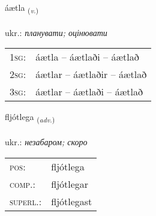 \documentclass[frontgrid, backgrid]{flacards}\usepackage[]{graphicx}\usepackage[]{xcolor}
\begin{document}
\renewcommand{\flhead}{\vskip5pt \fboxsep=0pt {\small\bfseries\footnotesize Sagnorð | дієслово}}
\renewcommand{\fcfoot}{\vskip5pt \fboxsep=0pt \hspace{2pt}{\small\bfseries\footnotesize 2K}}

\renewcommand{\blhead}{\vskip5pt {\small\bfseries\footnotesize Sagnorð | дієслово }}
\renewcommand{\bcfoot}{\vskip5pt \hspace{2pt}{\small\bfseries\footnotesize 2K}}


{áætla \small{\textsubscript{(\textit{v.})}} \\[1ex] %
\textphonetic{[auːaihtla]} \\
ukr.: \emph{планувати; оцінювати} \\  [2ex]
\renewcommand*{\arraystretch}{0.8}
\begin{tabular}{p{1cm}l}
\textsc{1sg}: & áætla -- áætlaði -- áætlað \\ 
\textsc{2sg}: & áætlar -- áætlaðir -- áætlað \\ 
\textsc{3sg}: & áætlar -- áætlaði -- áætlað \\ 
\end{tabular}
}

\renewcommand{\flhead}{\vskip5pt \fboxsep=0pt {\small\bfseries\footnotesize Atviksorð | прислівник}}
\renewcommand{\fcfoot}{\vskip5pt \fboxsep=0pt \hspace{2pt}{\small\bfseries\footnotesize 2K}}

\renewcommand{\blhead}{\vskip5pt {\small\bfseries\footnotesize Atviksorð | прислівник }}
\renewcommand{\bcfoot}{\vskip5pt \hspace{2pt}{\small\bfseries\footnotesize 2K}}


{fljótlega \small{\textsubscript{(\textit{adv.})}} \\[1ex] %
\textphonetic{[fljoutlɛɣa]} \\
ukr.: \emph{незабаром; скоро} \\  [2ex]
\renewcommand*{\arraystretch}{0.8}
\begin{tabular}{ll}
\textsc{pos}: & fljótlega \\ 
\textsc{comp.}: & fljótlegar \\ 
\textsc{superl.}: & fljótlegast \\
\end{tabular}
}
\end{document}

